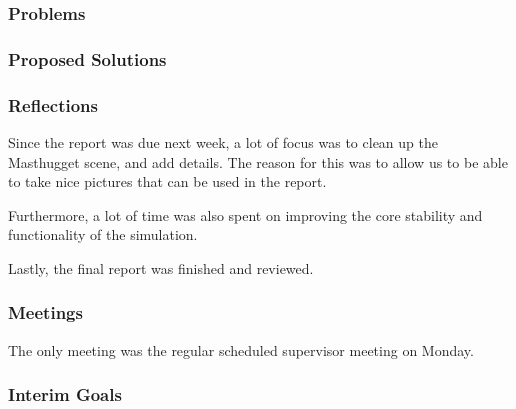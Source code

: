\subsubsection{Problems}


\subsubsection{Proposed Solutions}


\subsubsection{Reflections}

    Since the report was due next week, a lot of focus was to clean up the Masthugget scene, and add details. The reason for this was to allow us to be able to take nice pictures that can be used in the report.

    Furthermore, a lot of time was also spent on improving the core stability and functionality of the simulation.

    Lastly, the final report was finished and reviewed.

\subsubsection{Meetings}

    The only meeting was the regular scheduled supervisor meeting on Monday.

\subsubsection{Interim Goals}


